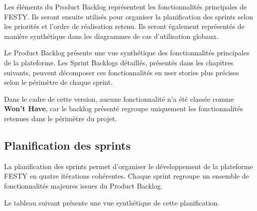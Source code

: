 Les éléments du Product Backlog représentent les fonctionnalités principales de FESTY. Ils seront ensuite utilisés pour organiser la planification des sprints selon les priorités et l’ordre de réalisation retenu. Ils seront également représentés de manière synthétique dans les diagrammes de cas d’utilisation globaux.


Le Product Backlog présente une vue synthétique des fonctionnalités principales de la plateforme. Les Sprint Backlogs détaillés, présentés dans les chapitres suivants, peuvent décomposer ces fonctionnalités en user stories plus précises selon le périmètre de chaque sprint.


Dans le cadre de cette version, aucune fonctionnalité n’a été classée comme \textbf{Won’t Have}, car le backlog présenté regroupe uniquement les fonctionnalités retenues dans le périmètre du projet.


\subsection{Planification des sprints}


La planification des sprints permet d’organiser le développement de la plateforme FESTY en quatre itérations cohérentes. Chaque sprint regroupe un ensemble de fonctionnalités majeures issues du Product Backlog.


Le tableau suivant présente une vue synthétique de cette planification.


